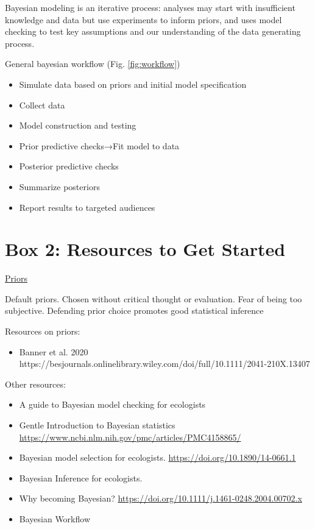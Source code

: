 \documentclass{article}
\begin{document}
\par Bayesian modeling is an iterative process: analyses may start with insufficient knowledge and data but use experiments to inform priors, and uses model checking to test key assumptions and our understanding of the data generating process.
\par General bayesian workflow (Fig. \ref{fig:workflow})
\begin{itemize}
\item Simulate data based on priors and initial model specification 
\item Collect data
\item Model construction and testing
\item Prior predictive checks→Fit model to data
\item Posterior predictive checks
\item Summarize posteriors
\item Report results to targeted audiences
\end{itemize}



\section* {Box 2: Resources to Get Started}
\underline{Priors}
\par Default priors. Chosen without critical thought or evaluation. Fear of being too subjective. Defending prior choice promotes good statistical inference
\par Resources on priors: 

\begin{itemize}
\item Banner et al. 2020 https://besjournals.onlinelibrary.wiley.com/doi/full/10.1111/2041-210X.13407 
\end{itemize}

\par Other resources:
\begin{itemize}
\item A guide to Bayesian model checking for ecologists \citep{conn2018guide}
\item Gentle Introduction to Bayesian statistics \citep{van2014gentle}
\href{https://www.ncbi.nlm.nih.gov/pmc/articles/PMC4158865/}{https://www.ncbi.nlm.nih.gov/pmc/articles/PMC4158865/}
\item Bayesian model selection for ecologists. \citep{hooten2015guide}
 \href{https://doi.org/10.1890/14-0661.1}{https://doi.org/10.1890/14-0661.1}
\item Bayesian Inference for ecologists. \citep{elis2004}
\item Why becoming Bayesian? \citep{clark2005environmental}
 \href{https://doi.org/10.1111/j.1461-0248.2004.00702.x}{https://doi.org/10.1111/j.1461-0248.2004.00702.x}
\item Bayesian Workflow \citep{gelman2020bayesia}

\end{itemize}
 
\end{document}
